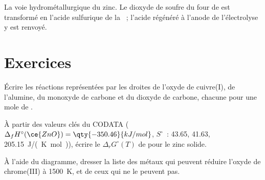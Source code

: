 \begin{omfigure}

{\small La voie hydrométallurgique du zinc. Le dioxyde de soufre du four de 
est transformé en l'acide sulfurique de la ~; l'acide régénéré à
l'anode de l'électrolyse y est renvoyé.}
\end{omfigure}

\section{Exercices}

\begin{exercise}[$\star$]\label{exo:b2:ellingham:1}
Écrire les réactions représentées par les droites de l'oxyde de cuivre(I), de l'alumine, du monoxyde
de carbone et du dioxyde de carbone, chacune pour une mole de .
\end{exercise}

\begin{exercise}[$\star$]\label{exo:b2:ellingham:2}
À partir des valeurs clés du CODATA ($\Delta_f H^\circ(\ce{ZnO}) = \qty{-350.46}{kJ/mol}$,
$S^\circ$~:  43.65,  41.63,  \qty{205.15}{J/(K.mol)}),
écrire le $\Delta_r G^\circ(T)$ de  pour le zinc solide.
\end{exercise}

\begin{exercise}[$\star$]\label{exo:b2:ellingham:3}
À l'aide du diagramme, dresser la liste des métaux qui peuvent réduire l'oxyde de chrome(III) à
\qty{1500}{K}, et de ceux qui ne le peuvent pas.
\end{exercise}

